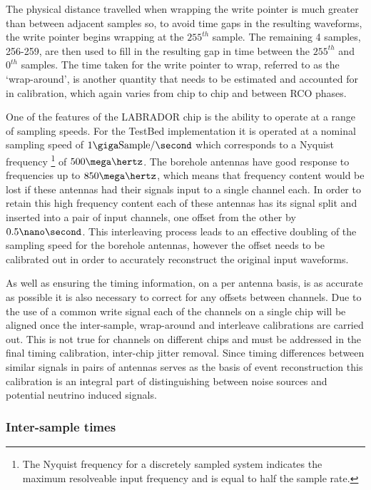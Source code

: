 The physical distance travelled when wrapping the write pointer is much greater than between adjacent samples so, to avoid time gaps in the resulting waveforms, the write pointer begins wrapping at the $255^{th}$ sample. The remaining 4 samples, 256-259, are then used to fill in the resulting gap in time between the $255^{th}$ and $0^{th}$ samples.  The time taken for the write pointer to wrap, referred to as the `wrap-around', is another quantity that needs to be estimated and accounted for in calibration, which again varies from chip to chip and between RCO phases.


One of the features of the LABRADOR chip is the ability to operate at a range of sampling speeds. For the TestBed implementation it is operated at a nominal sampling speed of $1 \giga \mbox{Sample} /\second$ which corresponds to a Nyquist frequency \footnote{The Nyquist frequency for a discretely sampled system indicates the maximum resolveable input frequency and is equal to half the sample rate.} of $500 \mega \hertz$. The borehole antennas have good response to frequencies up to $850 \mega \hertz$, which means that frequency content would be lost if these antennas had their signals input to a single channel each. In order to retain this high frequency content each of these antennas has its signal split and inserted into a pair of input channels, one offset from the other by $0.5 \nano \second$. This interleaving process leads to an effective doubling of the sampling speed for the borehole antennas, however the offset needs to be calibrated out in order to accurately reconstruct the original input waveforms. 

As well as ensuring the timing information, on a per antenna basis, is as accurate as possible it is also necessary to correct for any offsets between channels. Due to the use of a common write signal each of the channels on a single chip will be aligned once the inter-sample, wrap-around and interleave calibrations are carried out. This is not true for channels on different chips and must be addressed in the final timing calibration, inter-chip jitter removal. Since timing differences between similar signals in pairs of antennas serves as the basis of event reconstruction this calibration is an integral part of distinguishing between noise sources and potential neutrino induced signals. 

\subsubsection{Inter-sample times}
\label{sec:calibration:LABRADOR-Digitiser-Chip:Inter-sample-times}


